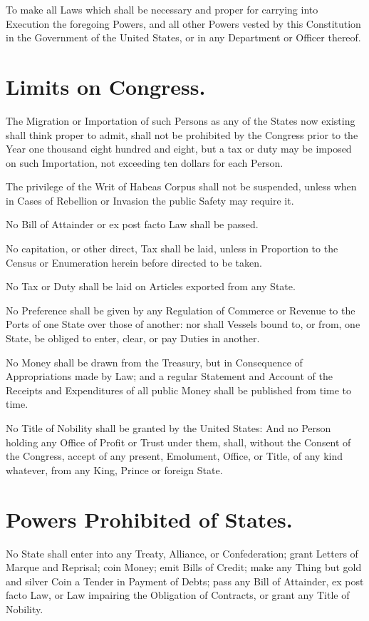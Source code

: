 \documentclass[12pt]{constitution}
\begin{document}
To make all Laws which shall be necessary and proper for carrying into
Execution the foregoing Powers, and all other Powers vested by this
Constitution in the Government of the United States, or in any Department or
Officer thereof.


\section{Limits on Congress.}
The Migration or Importation of such Persons as any of the States now existing
shall think proper to admit, shall not be prohibited by the Congress prior to
the Year one thousand eight hundred and eight, but a tax or duty may be imposed
on such Importation, not exceeding ten dollars for each Person.

The privilege of the Writ of Habeas Corpus shall not be suspended, unless when
in Cases of Rebellion or Invasion the public Safety may require it.

No Bill of Attainder or ex post facto Law shall be passed.

No capitation, or other direct, Tax shall be laid, unless in Proportion to the
Census or Enumeration herein before directed to be taken.

No Tax or Duty shall be laid on Articles exported from any State.

No Preference shall be given by any Regulation of Commerce or Revenue to the
Ports of one State over those of another: nor shall Vessels bound to, or from,
one State, be obliged to enter, clear, or pay Duties in another.

No Money shall be drawn from the Treasury, but in Consequence of Appropriations
made by Law; and a regular Statement and Account of the Receipts and
Expenditures of all public Money shall be published from time to time.

No Title of Nobility shall be granted by the United States: And no Person
holding any Office of Profit or Trust under them, shall, without the Consent of
the Congress, accept of any present, Emolument, Office, or Title, of any kind
whatever, from any King, Prince or foreign State.


\section{Powers Prohibited of States.}
No State shall enter into any Treaty, Alliance, or Confederation; grant Letters
of Marque and Reprisal; coin Money; emit Bills of Credit; make any Thing but
gold and silver Coin a Tender in Payment of Debts; pass any Bill of Attainder,
ex post facto Law, or Law impairing the Obligation of Contracts, or grant any
Title of Nobility.
\end{document}
